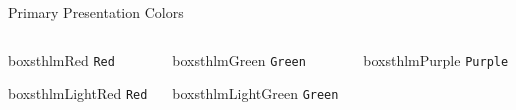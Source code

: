 \documentclass[newPxFont,numfooter,sectionpages]{beamer}
\begin{document}
\begin{frame}[c]{Primary Presentation Colors}
\begin{columns}[c]
\begin{column}{0.12\textwidth}
    \vspace{3em}
    \begin{beamercolorbox}[wd=\linewidth,ht=5ex,dp=3ex]{boxsthlmRed}
    \centering
        \texttt{Red}
    \end{beamercolorbox}
    
    \vspace{3em}
    
    \begin{beamercolorbox}[wd=\linewidth,ht=5ex,dp=3ex]{boxsthlmLightRed}
    \centering
        \texttt{Red}
    \end{beamercolorbox}
    \end{column}
    
    \begin{column}{0.12\textwidth}
    
    \vspace{3em}
    
    \begin{beamercolorbox}[wd=\linewidth,ht=5ex,dp=3ex]{boxsthlmGreen}
    \centering
        \texttt{Green}
    \end{beamercolorbox}
    
    \vspace{3em}
    
    \begin{beamercolorbox}[wd=\linewidth,ht=5ex,dp=3ex]{boxsthlmLightGreen}
    \centering
        \texttt{Green}
    \end{beamercolorbox}
    \end{column}
    
    \begin{column}{0.12\textwidth}
    
    \vspace{3em}
    
    \begin{beamercolorbox}[wd=\linewidth,ht=5ex,dp=3ex]{boxsthlmPurple}
    \centering
        \texttt{Purple}
    \end{beamercolorbox}
    
    \vspace{3em}
    

\end{column}
\end{columns}
\end{frame}
\end{document}
